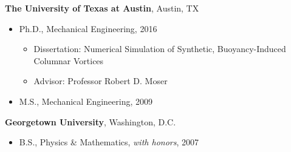 %
\textbf{The University of Texas at Austin}, 
Austin, TX
\begin{itemize}

\item Ph.D., 
        Mechanical Engineering, 2016
        \begin{itemize}
        \item Dissertation: Numerical Simulation of Synthetic, Buoyancy-Induced Columnar Vortices
        \item Advisor: Professor Robert D. Moser
        \end{itemize}

\item M.S., 
        Mechanical Engineering, 2009 

\end{itemize}

\textbf{Georgetown University}, 
Washington, D.C. 
\begin{itemize}

\item B.S., 
        Physics \& Mathematics, \emph{with honors}, 2007
\end{itemize}


